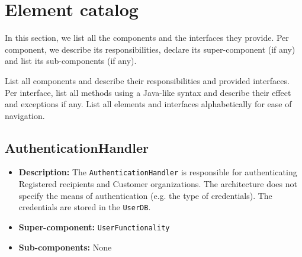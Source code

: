 \documentclass[a4paper,10pt]{article}
\begin{document}
\FloatBarrier


\appendix
\section{Element catalog}\label{app:catalog}
In this section, we list all the components and the interfaces they provide. Per component, we describe its responsibilities, declare its super-component (if any) and list its sub-components (if any).



List all components and describe their responsibilities and provided
interfaces.
Per interface, list all methods using a Java-like syntax and describe their
effect and exceptions if any.
List all elements and interfaces alphabetically for ease of navigation.

\subsection{AuthenticationHandler}
\begin{itemize}
    \item \textbf{Description:} The \texttt{AuthenticationHandler} is responsible for authenticating Registered recipients and Customer organizations. The architecture does not specify the means of authentication (e.g. the type of credentials). The credentials are stored in the \texttt{UserDB}.
    \item \textbf{Super-component:} \texttt{UserFunctionality}
    \item \textbf{Sub-components:} None
\end{itemize}
\end{document}
